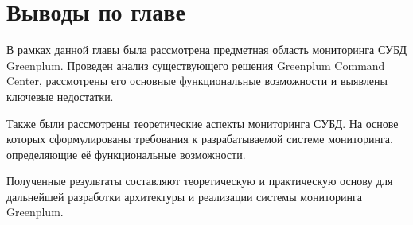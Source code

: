 \section{Выводы по главе} \label{ch1:conclusion}

В рамках данной главы была рассмотрена предметная область мониторинга СУБД Greenplum. Проведен анализ существующего решения Greenplum Command Center, рассмотрены его основные функциональные возможности и выявлены ключевые недостатки.

Также были рассмотрены теоретические аспекты мониторинга СУБД. На основе которых сформулированы требования к разрабатываемой системе мониторинга, определяющие её функциональные возможности.

Полученные результаты составляют теоретическую и практическую основу для дальнейшей разработки архитектуры и реализации системы мониторинга Greenplum.

\newpage
